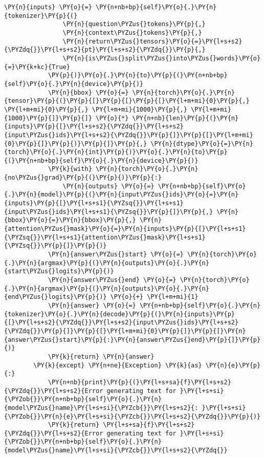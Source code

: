 \documentclass[11pt]{wseas}
\begin{document}
\begin{tcolorbox}[breakable, size=fbox, boxrule=1pt, pad at break*=1mm,colback=cellbackground, colframe=cellborder]
\begin{Verbatim}[commandchars=\\\{\}]
            \PY{n}{inputs} \PY{o}{=} \PY{n+nb+bp}{self}\PY{o}{.}\PY{n}{tokenizer}\PY{p}{(}
                \PY{n}{question\PYZus{}tokens}\PY{p}{,}
                \PY{n}{context\PYZus{}tokens}\PY{p}{,}
                \PY{n}{return\PYZus{}tensors}\PY{o}{=}\PY{l+s+s2}{\PYZdq{}}\PY{l+s+s2}{pt}\PY{l+s+s2}{\PYZdq{}}\PY{p}{,}
                \PY{n}{is\PYZus{}split\PYZus{}into\PYZus{}words}\PY{o}{=}\PY{k+kc}{True}  
            \PY{p}{)}\PY{o}{.}\PY{n}{to}\PY{p}{(}\PY{n+nb+bp}{self}\PY{o}{.}\PY{n}{device}\PY{p}{)}
            \PY{n}{bbox} \PY{o}{=} \PY{n}{torch}\PY{o}{.}\PY{n}{tensor}\PY{p}{(}\PY{p}{[}\PY{p}{[}\PY{p}{[}\PY{l+m+mi}{0}\PY{p}{,} \PY{l+m+mi}{0}\PY{p}{,} \PY{l+m+mi}{1000}\PY{p}{,} \PY{l+m+mi}{1000}\PY{p}{]}\PY{p}{]} \PY{o}{*} \PY{n+nb}{len}\PY{p}{(}\PY{n}{inputs}\PY{p}{[}\PY{l+s+s2}{\PYZdq{}}\PY{l+s+s2}{input\PYZus{}ids}\PY{l+s+s2}{\PYZdq{}}\PY{p}{]}\PY{p}{[}\PY{l+m+mi}{0}\PY{p}{]}\PY{p}{)}\PY{p}{]}\PY{p}{,} \PY{n}{dtype}\PY{o}{=}\PY{n}{torch}\PY{o}{.}\PY{n}{int}\PY{p}{)}\PY{o}{.}\PY{n}{to}\PY{p}{(}\PY{n+nb+bp}{self}\PY{o}{.}\PY{n}{device}\PY{p}{)}
            \PY{k}{with} \PY{n}{torch}\PY{o}{.}\PY{n}{no\PYZus{}grad}\PY{p}{(}\PY{p}{)}\PY{p}{:}
                \PY{n}{outputs} \PY{o}{=} \PY{n+nb+bp}{self}\PY{o}{.}\PY{n}{model}\PY{p}{(}\PY{n}{input\PYZus{}ids}\PY{o}{=}\PY{n}{inputs}\PY{p}{[}\PY{l+s+s1}{\PYZsq{}}\PY{l+s+s1}{input\PYZus{}ids}\PY{l+s+s1}{\PYZsq{}}\PY{p}{]}\PY{p}{,} \PY{n}{bbox}\PY{o}{=}\PY{n}{bbox}\PY{p}{,} \PY{n}{attention\PYZus{}mask}\PY{o}{=}\PY{n}{inputs}\PY{p}{[}\PY{l+s+s1}{\PYZsq{}}\PY{l+s+s1}{attention\PYZus{}mask}\PY{l+s+s1}{\PYZsq{}}\PY{p}{]}\PY{p}{)}
            \PY{n}{answer\PYZus{}start} \PY{o}{=} \PY{n}{torch}\PY{o}{.}\PY{n}{argmax}\PY{p}{(}\PY{n}{outputs}\PY{o}{.}\PY{n}{start\PYZus{}logits}\PY{p}{)}
            \PY{n}{answer\PYZus{}end} \PY{o}{=} \PY{n}{torch}\PY{o}{.}\PY{n}{argmax}\PY{p}{(}\PY{n}{outputs}\PY{o}{.}\PY{n}{end\PYZus{}logits}\PY{p}{)} \PY{o}{+} \PY{l+m+mi}{1}
            \PY{n}{answer} \PY{o}{=} \PY{n+nb+bp}{self}\PY{o}{.}\PY{n}{tokenizer}\PY{o}{.}\PY{n}{decode}\PY{p}{(}\PY{n}{inputs}\PY{p}{[}\PY{l+s+s2}{\PYZdq{}}\PY{l+s+s2}{input\PYZus{}ids}\PY{l+s+s2}{\PYZdq{}}\PY{p}{]}\PY{p}{[}\PY{l+m+mi}{0}\PY{p}{]}\PY{p}{[}\PY{n}{answer\PYZus{}start}\PY{p}{:}\PY{n}{answer\PYZus{}end}\PY{p}{]}\PY{p}{)}
            \PY{k}{return} \PY{n}{answer}
        \PY{k}{except} \PY{n+ne}{Exception} \PY{k}{as} \PY{n}{e}\PY{p}{:}
            \PY{n+nb}{print}\PY{p}{(}\PY{l+s+sa}{f}\PY{l+s+s2}{\PYZdq{}}\PY{l+s+s2}{Error generating text for }\PY{l+s+si}{\PYZob{}}\PY{n+nb+bp}{self}\PY{o}{.}\PY{n}{model\PYZus{}name}\PY{l+s+si}{\PYZcb{}}\PY{l+s+s2}{: }\PY{l+s+si}{\PYZob{}}\PY{n}{e}\PY{l+s+si}{\PYZcb{}}\PY{l+s+s2}{\PYZdq{}}\PY{p}{)}
            \PY{k}{return} \PY{l+s+sa}{f}\PY{l+s+s2}{\PYZdq{}}\PY{l+s+s2}{Error generating text for }\PY{l+s+si}{\PYZob{}}\PY{n+nb+bp}{self}\PY{o}{.}\PY{n}{model\PYZus{}name}\PY{l+s+si}{\PYZcb{}}\PY{l+s+s2}{\PYZdq{}}


\end{Verbatim}
\end{tcolorbox}
\end{document}
